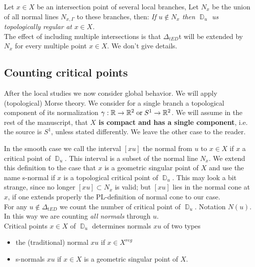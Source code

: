 \documentclass[12pt,a4,twoside]{amsart}
\DeclareMathOperator{\sq}{\mathbb{D}}
\newtheorem*{main lemma}{The main lemma}
\begin{document}
Let $x \in X$ be an intersection point of several local branches, Let $N_x$  be the union of all normal lines $N_{x,\Gamma}$ to these  branches, then:
\textit{If $u \notin N_x$ then $\sq_u$ us topologically regular at $x \in X$. }\\
The effect of including multiple intersections is that $\Delta_{tED}$t will be extended by $N_x$ for every multiple point $x \in X$.
We don't give details.


\subsection{Counting critical points}
After the local studies we now consider global behavior. 
We will  apply (topological) Morse theory. 
We consider for a single branch a topological component of its normalization $\gamma: \mathbb{R} \to \mathbb{R}^2 \; \mbox{\rm or} \; S^1  \to \mathbb{R}^2$. We will assume in the rest of the manuscript, that \textbf{$X$ is  compact and has a single component}, i.e. the source is $S^1$, unless stated differently. We leave the other case to the reader.

In the smooth case we call the interval $[xu]$ the normal from $u$ to $x \in X$ if $x$ a critical point of $\sq_u$. This interval is a subset of the normal line $N_x$. We extend this definition to the case that  $x$ is a geometric singular point of $X$ and use the name s-normal  if $x$ is  a topological critical point of $\sq_u$. This may look a bit strange, since no longer $[xu] \subset N_x$ is valid; but $[xu]$  lies in the normal cone at $x$,  if one extends properly the PL-definition of normal cone to our case. \\

For any $u \notin \Delta_{tED}$ we count the number of critical point of $\sq_u$. Notation $N(u)$. 
In this way we are counting \textit {all normals} through $u$.\\
Critical points $x \in X$ of $\sq_u$ determines normals $xu$ of two types
\begin{itemize}
\item  the (traditional) normal  $xu$  if $x \in X^{reg}$  
\item  s-normals  $xu$ if $x \in X$ is a geometric singular point of $X$.
\end{itemize}
\end{document}
